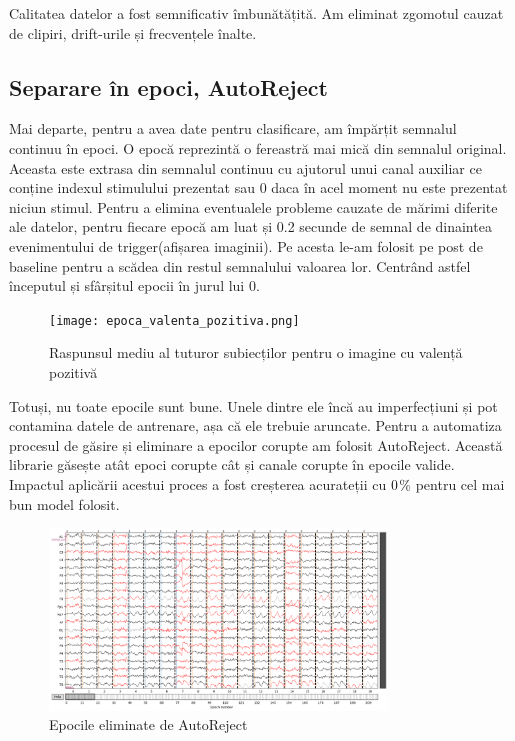 Calitatea datelor a fost semnificativ îmbunătățită. Am eliminat zgomotul cauzat de clipiri, drift-urile și frecvențele înalte.

\subsection{Separare în epoci, AutoReject}

Mai departe, pentru a avea date pentru clasificare, am împărțit semnalul continuu în epoci. O epocă reprezintă o fereastră mai mică din semnalul original. Aceasta este extrasa din semnalul continuu cu ajutorul unui canal auxiliar ce conține indexul stimulului prezentat sau 0 daca în acel moment nu este prezentat niciun stimul. Pentru a elimina eventualele probleme cauzate de mărimi diferite ale datelor, pentru fiecare epocă am luat și 0.2 secunde de semnal de dinaintea evenimentului de trigger(afișarea imaginii). Pe acesta le-am folosit pe post de baseline pentru a scădea din restul semnalului valoarea lor. Centrând astfel începutul și sfârșitul epocii în jurul lui 0.

\setlength{\abovecaptionskip}{0pt}
\setlength{\belowcaptionskip}{0pt}
\clearpage
\begin{figure}
    \centering
    \texttt{[image: epoca\_valenta\_pozitiva.png]}
    \caption{Raspunsul mediu al tuturor subiecților pentru o imagine cu valență pozitivă}
    \label{fig:enter-label}
\end{figure}

Totuși, nu toate epocile sunt bune. Unele dintre ele încă au imperfecțiuni și pot contamina datele de antrenare, așa că ele trebuie aruncate. Pentru a automatiza procesul de găsire și eliminare a epocilor corupte am folosit AutoReject\cite{AutoReject}. Această librarie găsește atât epoci corupte cât și canale corupte în epocile valide. Impactul aplicării acestui proces a fost creșterea acurateții cu $0$\% pentru cel mai bun model folosit.

\vspace{1em}
\begin{figure}[h]
    \centering
    \includegraphics[width=0.8\textwidth]{images/rezultat_autoreject.png}
    \caption{Epocile eliminate de AutoReject}
    \label{fig:vizualizare_filtru}
\end{figure}

